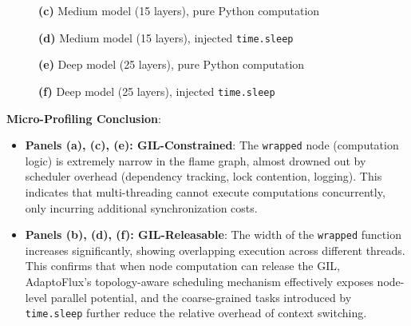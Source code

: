 \begin{figure}[p]
    \centering
    {\small\textbf{(c)} Medium model (15 layers), pure Python computation}\par\medskip
    \par{}
\end{figure}

\begin{figure}[p]
    \centering
    {\small\textbf{(d)} Medium model (15 layers), injected \texttt{time.sleep}}\par\medskip
    \par{}
\end{figure}

\begin{figure}[p]
    \centering
    {\small\textbf{(e)} Deep model (25 layers), pure Python computation}\par\medskip
    \par{}
\end{figure}

\begin{figure}[p]
    \centering
    {\small\textbf{(f)} Deep model (25 layers), injected \texttt{time.sleep}}\par\medskip
    \par{}
\end{figure}

\textbf{Micro-Profiling Conclusion}:
\begin{itemize}
    \item \textbf{Panels (a), (c), (e): GIL-Constrained}: The \texttt{wrapped} node (computation logic) is extremely narrow in the flame graph, almost drowned out by scheduler overhead (dependency tracking, lock contention, logging). This indicates that multi-threading cannot execute computations concurrently, only incurring additional synchronization costs.
    \item \textbf{Panels (b), (d), (f): GIL-Releasable}: The width of the \texttt{wrapped} function increases significantly, showing overlapping execution across different threads. This confirms that when node computation can release the GIL, AdaptoFlux's topology-aware scheduling mechanism effectively exposes node-level parallel potential, and the coarse-grained tasks introduced by \texttt{time.sleep} further reduce the relative overhead of context switching.
\end{itemize}


